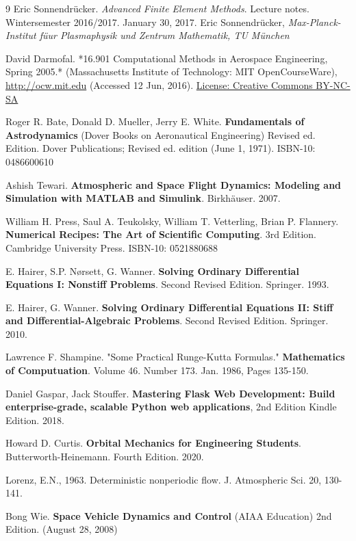 \documentclass[10pt]{amsart}
\begin{document}
\begin{thebibliography}{9}
Eric Sonnendr\"{u}cker.  \emph{Advanced Finite Element Methods}.  Lecture notes.  Wintersemester 2016/2017.  January 30, 2017.  Eric Sonnendr\"{u}cker, \emph{Max-Planck-Institut f\"{u}ur Plasmaphysik und Zentrum Mathematik, TU M\"{u}nchen}

  David Darmofal. *16.901 Computational Methods in Aerospace Engineering, Spring 2005.* (Massachusetts Institute of Technology: MIT OpenCourseWare), \url{http://ocw.mit.edu} (Accessed 12 Jun, 2016). \href{http://creativecommons.org/licenses/by-nc-sa/4.0/}{License: Creative Commons BY-NC-SA}

Roger R. Bate, Donald D. Mueller, Jerry E. White. \textbf{Fundamentals of Astrodynamics} (Dover Books on Aeronautical Engineering) Revised ed. Edition. Dover Publications; Revised ed. edition (June 1, 1971). ISBN-10: 0486600610

Ashish Tewari. \textbf{Atmospheric and Space Flight Dynamics: Modeling and Simulation with MATLAB and Simulink}. Birkh\"{a}user. 2007.

William H. Press, Saul A. Teukolsky, William T. Vetterling, Brian P. Flannery. \textbf{Numerical Recipes: The Art of Scientific Computing}. 3rd Edition.  Cambridge University Press.  ISBN-10: 0521880688

E. Hairer, S.P. N\o rsett, G. Wanner. \textbf{Solving Ordinary Differential Equations I: Nonstiff Problems}. Second Revised Edition. Springer. 1993. 

E. Hairer, G. Wanner. \textbf{Solving Ordinary Differential Equations II: Stiff and Differential-Algebraic Problems}. Second Revised Edition. Springer. 2010.

Lawrence F. Shampine. "Some Practical Runge-Kutta Formulas." \textbf{Mathematics of Computuation}. Volume 46. Number 173. Jan. 1986, Pages 135-150.

Daniel Gaspar, Jack Stouffer.
\textbf{Mastering Flask Web Development: Build enterprise-grade, scalable Python web applications}, 2nd Edition Kindle Edition. 2018.

Howard D. Curtis. \textbf{Orbital Mechanics for Engineering Students}. Butterworth-Heinemann. Fourth Edition. 2020.

Lorenz, E.N., 1963. Deterministic nonperiodic flow. J. Atmospheric Sci. 20, 130-141.

Bong Wie. \textbf{Space Vehicle Dynamics and Control} (AIAA Education) 2nd Edition. (August 28, 2008)


\end{thebibliography}
\end{document}
